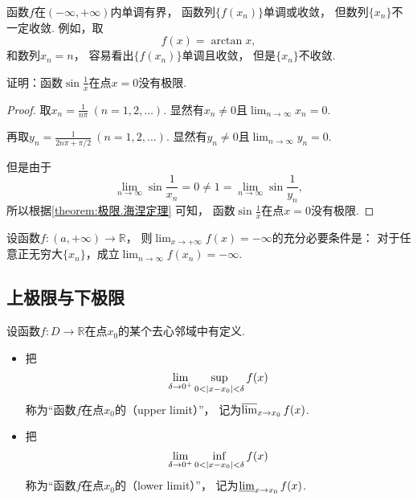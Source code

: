 \begin{example}
函数\(f\)在\((-\infty,+\infty)\)内单调有界，
函数列\(\{f(x_n)\}\)单调或收敛，
但数列\(\{x_n\}\)不一定收敛.
例如，取\begin{equation*}
	f(x) = \arctan x,
\end{equation*}
和数列\(x_n = n\)，
容易看出\(\{f(x_n)\}\)单调且收敛，
但是\(\{x_n\}\)不收敛.
\end{example}

\begin{example}
证明：函数\(\sin\frac1x\)在点\(x=0\)没有极限.
\begin{proof}
取\(x_n = \frac1{n\pi}\ (n=1,2,\dotsc)\).
显然有\(x_n\neq0\)且\(\lim_{n\to\infty} x_n = 0\).

再取\(y_n = \frac1{2n\pi+\pi/2}\ (n=1,2,\dotsc)\).
显然有\(y_n\neq0\)且\(\lim_{n\to\infty} y_n = 0\).

但是由于\begin{equation*}
	\lim_{n\to\infty} \sin\frac1{x_n} = 0
	\neq 1 = \lim_{n\to\infty} \sin\frac1{y_n},
\end{equation*}
所以根据\cref{theorem:极限.海涅定理} 可知，
函数\(\sin\frac1x\)在点\(x=0\)没有极限.
\end{proof}
\end{example}

\begin{theorem}
设函数\(f\colon (a,+\infty)\to\mathbb{R}\)，
则\(\lim_{x\to+\infty} f(x) = -\infty\)的充分必要条件是：
对于任意正无穷大\(\{x_n\}\)，成立\(\lim_{n\to\infty} f(x_n) = -\infty\).
\end{theorem}

\subsection{上极限与下极限}
\begin{definition}
设函数\(f\colon D\to\mathbb{R}\)在点\(x_0\)的某个去心邻域中有定义.
\begin{itemize}
	\item 把\begin{equation*}
		\lim_{\delta\to0^+} \sup_{0<\abs{x-x_0}<\delta} f(x)
	\end{equation*}称为“函数\(f\)在点\(x_0\)的（upper limit）”，
	记为\(\varlimsup_{x \to x_0} f(x)\).

	\item 把\begin{equation*}
		\lim_{\delta\to0^+} \inf_{0<\abs{x-x_0}<\delta} f(x)
	\end{equation*}称为“函数\(f\)在点\(x_0\)的（lower limit）”，
	记为\(\varliminf_{x \to x_0} f(x)\).
\end{itemize}
\end{definition}

